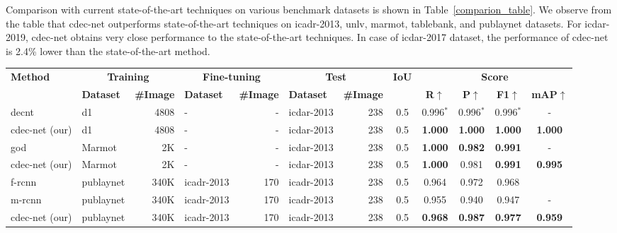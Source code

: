 \documentclass[a4paper,conference]{IEEEtran}
\begin{document}
Comparison with current state-of-the-art techniques on various benchmark datasets is shown in Table~\ref{comparion_table}. We observe from the table that {\sc cd}e{\sc c-n}et outperforms state-of-the-art techniques on {\sc icadr-2013}, {\sc unlv}, {\sc m}armot, {\sc t}able{\sc b}ank, and {\sc p}ub{\sc l}ay{\sc n}et datasets. For {\sc icdar-2019}, {\sc cd}e{\sc c-n}et obtains very close performance to the state-of-the-art techniques. In case of {\sc icdar-2017} dataset, the performance of {\sc cd}e{\sc c-n}et is 2.4\% lower than the state-of-the-art method.

\begin{table*}
\addtolength{\tabcolsep}{-1.0pt}
\begin{center}
\begin{tabular}{|l| l | r|l |r|l|r| c| c c c c|} \hline
\textbf{Method} &\multicolumn{2}{|c|}{\textbf{Training}} &\multicolumn{2}{|c|}{\textbf{Fine-tuning}} &\multicolumn{2}{|c|}{\textbf{Test}} &\textbf{IoU} & \multicolumn{4}{|c|}{\textbf{Score}} \\ \cline{2-7} \cline{9-12}
  &\textbf{Dataset} &\textbf{\#Image} &\textbf{Dataset} &\textbf{\#Image} &\textbf{Dataset} &\textbf{\#Image} &  &\textbf{R}$\uparrow$ &\textbf{P}$\uparrow$ &\textbf{F1}$\uparrow$ &\textbf{mAP}$\uparrow$ \\ \hline
{\sc d}e{\sc cnt}~\cite{siddiqui2018decnt} &{\sc d}1 &4808 &- &- &{\sc icdar}-2013 &238 &0.5 &0.996$^{*}$ &0.996$^{*}$ &0.996$^{*}$ &- \\ 
{\sc cd}e{\sc c-n}et (our) &{\sc d}1 &4808 &- &- &{\sc icdar}-2013 &238 &0.5 &\textbf{1.000} &\textbf{1.000} &\textbf{1.000} &\textbf{1.000} \\ 
\hhline{|=|=|=|=|=|=|=|=|====|}
{\sc god}~\cite{saha2019graphical}   &Marmot &2K &- &- &{\sc icdar}-2013 &238 &0.5  &\textbf{1.000} &\textbf{0.982} &\textbf{0.991} &-  \\ 
{\sc cd}e{\sc c-n}et (our)         &Marmot &2K &-  &-  &{\sc icdar}-2013 &238 &0.5  &\textbf{1.000} &0.981 &\textbf{0.991} &\textbf{0.995}  \\ \hhline{|=|=|=|=|=|=|=|=|====|} 
{\sc f-rcnn}~\cite{zhong2019publaynet} &{\sc p}ub{\sc l}ay{\sc n}et &340K &{\sc icadr}-2013 &170 &{\sc icadr}-2013 &238 &0.5 &0.964 &0.972 &0.968 &  \\ 
{\sc m-rcnn}~\cite{zhong2019publaynet} &{\sc p}ub{\sc l}ay{\sc n}et &340K &{\sc icadr}-2013 &170 &{\sc icadr}-2013 &238 &0.5 &0.955 &0.940 &0.947 &-  \\ 
{\sc cd}e{\sc c-n}et (our) &{\sc p}ub{\sc l}ay{\sc n}et &340K &{\sc icadr}-2013 &170 &{\sc icadr}-2013 &238 &0.5 & \textbf{0.968}	& \textbf{0.987} & \textbf{0.977} & \textbf{0.959} \\ 

\end{tabular}
\end{center}
\end{table*}
\end{document}
